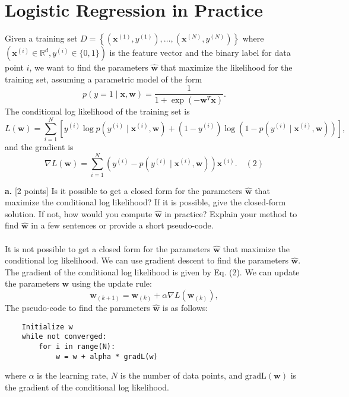 \documentclass[a3paper,12pt]{extarticle} %
\begin{document}
\section{Logistic Regression in Practice}
Given a training set \( D = \left\{ \left( \mathbf{x}^{(1)}, y^{(1)} \right), \dots, \left( \mathbf{x}^{(N)}, y^{(N)} \right) \right\} \) where \( \left( \mathbf{x}^{(i)} \in \mathbb{R}^d, y^{(i)} \in \{0, 1\} \right) \) is the feature vector and the binary label for data point \( i \), we want to find the parameters \( \hat{\mathbf{w}} \) that maximize the likelihood for the training set, assuming a parametric model of the form
\[
p(y = 1 \mid \mathbf{x}, \mathbf{w}) = \frac{1}{1 + \exp(-\mathbf{w}^T \mathbf{x})}.
\]
The conditional log likelihood of the training set is
\[
L(\mathbf{w}) = \sum_{i=1}^N \left[ y^{(i)} \log p\left( y^{(i)} \mid \mathbf{x}^{(i)}, \mathbf{w} \right) + \left( 1 - y^{(i)} \right) \log \left( 1 - p\left( y^{(i)} \mid \mathbf{x}^{(i)}, \mathbf{w} \right) \right) \right],
\]
and the gradient is
\[
\nabla L(\mathbf{w}) = \sum_{i=1}^N \left( y^{(i)} - p\left( y^{(i)} \mid \mathbf{x}^{(i)}, \mathbf{w} \right) \right) \mathbf{x}^{(i)}. \quad (2)
\]

\noindent \textbf{a.} [2 points] Is it possible to get a closed form for the parameters \( \hat{\mathbf{w}} \) that maximize the conditional log likelihood? If it is possible, give the closed-form solution. If not, how would you compute \( \hat{\mathbf{w}} \) in practice? Explain your method to find \( \hat{\mathbf{w}} \) in a few sentences or provide a short pseudo-code.
\\\\ It is not possible to get a closed form for the parameters \( \hat{\mathbf{w}} \) that maximize the conditional log likelihood. We can use gradient descent to find the parameters \( \hat{\mathbf{w}} \). The gradient of the conditional log likelihood is given by Eq. (2). We can update the parameters \( \mathbf{w} \) using the update rule:
\[
\mathbf{w}_{(k+1)} = \mathbf{w}_{(k)} + \alpha \nabla L(\mathbf{w}_{(k)}),
\]
The  pseudo-code to find the parameters \( \hat{\mathbf{w}} \) is as follows:
\begin{lstlisting}
    Initialize w
    while not converged:
        for i in range(N):
            w = w + alpha * gradL(w)
\end{lstlisting}
where \( \alpha \) is the learning rate, \( N \) is the number of data points, and \( \text{gradL}(\mathbf{w}) \) is the gradient of the conditional log likelihood.\\
\end{document}
